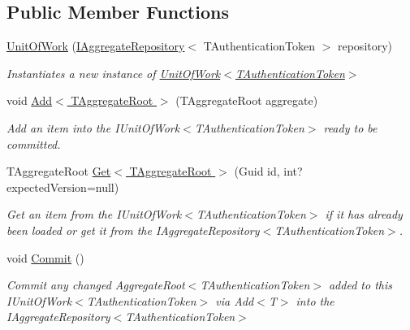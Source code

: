 \subsection*{Public Member Functions}
\begin{DoxyCompactItemize}
\item 
\hyperlink{classCqrs_1_1Domain_1_1UnitOfWork_a717facda044d5025e9d7abdec4f54acd_a717facda044d5025e9d7abdec4f54acd}{Unit\+Of\+Work} (\hyperlink{interfaceCqrs_1_1Domain_1_1IAggregateRepository}{I\+Aggregate\+Repository}$<$ T\+Authentication\+Token $>$ repository)
\begin{DoxyCompactList}\small\item\em Instantiates a new instance of \hyperlink{classCqrs_1_1Domain_1_1UnitOfWork_a717facda044d5025e9d7abdec4f54acd_a717facda044d5025e9d7abdec4f54acd}{Unit\+Of\+Work$<$\+T\+Authentication\+Token$>$} \end{DoxyCompactList}\item 
void \hyperlink{classCqrs_1_1Domain_1_1UnitOfWork_a840214f97d3661c7b5a739df65fadc9f_a840214f97d3661c7b5a739df65fadc9f}{Add$<$ T\+Aggregate\+Root $>$} (T\+Aggregate\+Root aggregate)
\begin{DoxyCompactList}\small\item\em Add an item into the I\+Unit\+Of\+Work$<$\+T\+Authentication\+Token$>$ ready to be committed. \end{DoxyCompactList}\item 
T\+Aggregate\+Root \hyperlink{classCqrs_1_1Domain_1_1UnitOfWork_a1e953136c916aee711068813078aed05_a1e953136c916aee711068813078aed05}{Get$<$ T\+Aggregate\+Root $>$} (Guid id, int? expected\+Version=null)
\begin{DoxyCompactList}\small\item\em Get an item from the I\+Unit\+Of\+Work$<$\+T\+Authentication\+Token$>$ if it has already been loaded or get it from the I\+Aggregate\+Repository$<$\+T\+Authentication\+Token$>$. \end{DoxyCompactList}\item 
void \hyperlink{classCqrs_1_1Domain_1_1UnitOfWork_a7401e41dd8ce4457551c252ca6402d31_a7401e41dd8ce4457551c252ca6402d31}{Commit} ()
\begin{DoxyCompactList}\small\item\em Commit any changed Aggregate\+Root$<$\+T\+Authentication\+Token$>$ added to this I\+Unit\+Of\+Work$<$\+T\+Authentication\+Token$>$ via Add$<$\+T$>$ into the I\+Aggregate\+Repository$<$\+T\+Authentication\+Token$>$ \end{DoxyCompactList}\end{DoxyCompactItemize}


